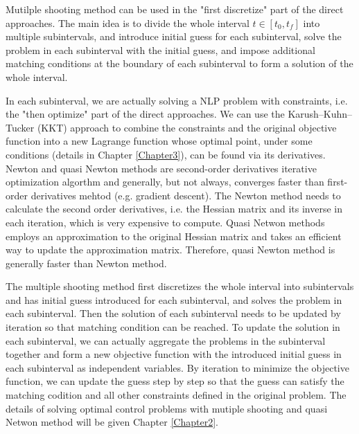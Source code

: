 \documentclass  [
  paper    = a4,
  BCOR     = 10mm,
  twoside,
  fontsize = 12pt,
  fleqn,
  toc      = bibnumbered,
  toc      = listofnumbered,
  numbers  = noendperiod,
  headings = normal,
  listof   = leveldown,
  version  = 3.03
]                                       {scrreprt}
\newcommand{\<}{\langle}
\renewcommand{\>}{\rangle}
\begin{document}
Mutilple shooting method can be used in the "first discretize" part of the direct approaches. The main idea is to divide the whole interval $t \in [t_0, t_f]$ into multiple subintervals, and introduce initial guess for each subinterval,  solve the problem in each subinterval with the initial guess, and impose additional matching conditions at the boundary of each subinterval to form a solution of the whole interval.   

In each subinterval, we are actually solving a NLP problem with constraints, i.e. the "then optimize" part of the direct approaches. We can use the Karush–Kuhn–Tucker (KKT) approach to combine the constraints and the original objective function into a new Lagrange function whose optimal point, under some conditions (details in Chapter \ref{Chapter3}), can be found via its derivatives.  Newton and quasi Newton methods are second-order derivatives iterative optimization algorthm and generally, but not always, converges faster than first-order derivatives mehtod (e.g. gradient descent). The Newton method needs to calculate the second order derivatives, i.e. the Hessian matrix and its inverse in each iteration, which is very expensive to compute. Quasi Netwon methods employs an approximation to the original Hessian matrix and takes an efficient way to update the approximation matrix. Therefore, quasi Newton method is generally faster than Newton method. 

The multiple shooting method first discretizes the whole interval into subintervals and has initial guess introduced for each subinterval, and solves the problem in each subinterval. Then the solution of each subinterval needs to be updated by iteration so that matching condition can be reached. To update the solution in each subinterval, we can actually aggregate the problems in the subinterval together and form a new objective function with the introduced initial guess in each subinterval as independent variables. By iteration to minimize the objective function, we can update the guess step by step so that the guess can satisfy the matching codition and all other constraints defined in the original problem.  The details of solving optimal control problems with mutiple shooting and quasi Netwon method will be given Chapter \ref{Chapter2}. 
\end{document}
